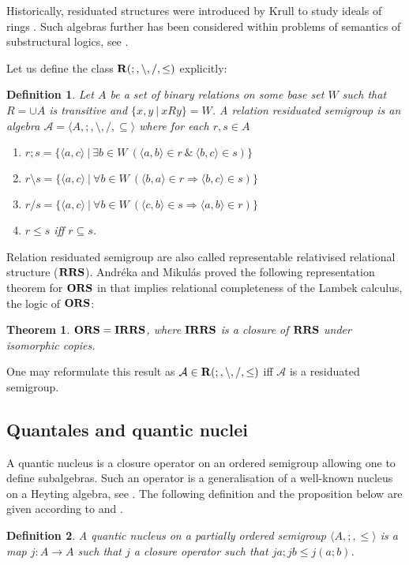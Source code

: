 \documentclass[a4paper]{article}
\theoremstyle{defin}
\newtheorem{defin}{Definition}
\theoremstyle{theorem}
\newtheorem{theorem}{Theorem}
\theoremstyle{prop}
\theoremstyle{lemma}
\theoremstyle{ex}
\theoremstyle{col}
\theoremstyle{claim}
\begin{document}
Historically, residuated structures were introduced by Krull to study ideals of rings \cite{krull1968idealtheorie}. Such algebras further has been considered within problems of semantics of substructural logics, see \cite{jipsen2002survey}.

Let us define the class ${\bf R}(;, \setminus, /, \leq)$ explicitly:

\begin{defin} \label{rrs}
  Let $A$ be a set of binary relations on some base set $W$ such that $R = \cup A$ is transitive and $\{ x, y \: | \: x R y \} = W$. A relation residuated semigroup is an algebra $\mathcal{A} = \langle A, ;, \setminus, /, \subseteq \rangle$ where for each $r, s \in A$
  \begin{enumerate}
    \item $r ; s = \{ \langle a, c \rangle \: | \: \exists b \in W \: (\langle a, b \rangle \in r \: \& \: \langle b, c \rangle \in s) \}$
    \item $r \setminus s = \{ \langle a, c \rangle \: | \: \forall b \in W \: (\langle b, a \rangle \in r \Rightarrow \langle b, c \rangle \in s)\}$
    \item $r / s = \{ \langle a, c \rangle \: | \: \forall b \in W \: (\langle c, b \rangle \in s \Rightarrow \langle a, b \rangle \in r)\}$
    \item $r \leq s$ iff $r \subseteq s$.
  \end{enumerate}
\end{defin}
Relation residuated semigroup are also called representable relativised relational structure (${\bf RRS}$).
Andr\'{e}ka and Mikul\'{a}s proved the following representation theorem for ${\bf ORS}$ in \cite{andreka1994lambek} that implies relational completeness of the Lambek calculus, the logic of ${\bf ORS}$:

\begin{theorem}\label{ors=irrs}
  ${\bf ORS} = {\bf IRRS}$, where ${\bf IRRS}$ is a closure of ${\bf RRS}$ under isomorphic copies.
\end{theorem}
One may reformulate this result as $\mathcal{A} \in {\bf R}(;, \setminus, /, \leq)$ iff $\mathcal{A}$ is a residuated semigroup.

\subsection{Quantales and quantic nuclei}

A quantic nucleus is a closure operator on an ordered semigroup allowing one to define subalgebras. Such an operator is a generalisation of a well-known nucleus on a Heyting algebra, see \cite{bezhanishvili2016locales}. The following definition and the proposition below are given according to \cite{galatos2007residuated} and \cite{rosenthal1990quantales}.
\begin{defin}
  A quantic nucleus on a partially ordered semigroup $\langle A, ;, \leq \rangle$ is a map $j : A \to A$ such that $j$ a closure operator such that $j a ; j b \leq j (a ; b)$.
\end{defin}
\end{document}
